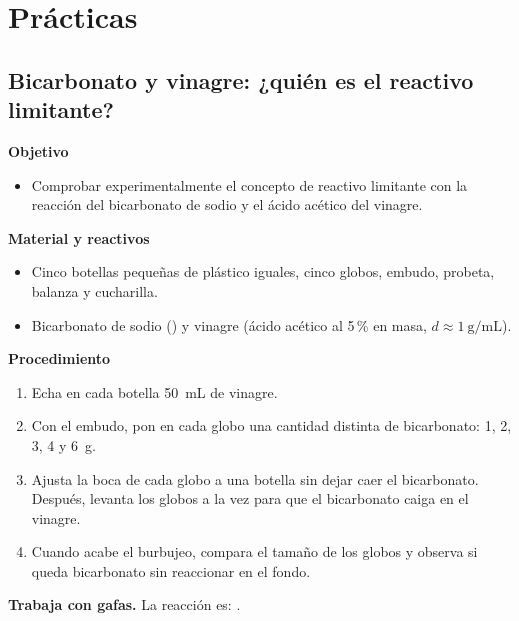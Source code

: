 \section{Prácticas}\label{sec:ud6-practicas}

\subsection{Bicarbonato y vinagre: ¿quién es el reactivo limitante?}

\noindent\begin{minipage}[t]{0.48\textwidth}
    \textbf{Objetivo}
    \begin{itemize}
        \item Comprobar experimentalmente el concepto de reactivo limitante con la reacción del bicarbonato de sodio y el ácido
        acético del vinagre.
    \end{itemize}
\end{minipage}\hfill
\begin{minipage}[t]{0.48\textwidth}
    \textbf{Material y reactivos}
    \begin{itemize}
        \item Cinco botellas pequeñas de plástico iguales, cinco globos, embudo, probeta, balanza y cucharilla.
        \item Bicarbonato de sodio () y vinagre (ácido acético al 5\,\% en masa, \(d \approx \qty{1}{\gram\per\mL}\)).
    \end{itemize}
\end{minipage}

\textbf{Procedimiento}
\begin{enumerate}[label=\numberballgreen]
    \item Echa en cada botella \qty{50}{\mL} de vinagre.
    \item Con el embudo, pon en cada globo una cantidad distinta de bicarbonato: 1, 2, 3, 4 y \qty{6}{\gram}.
    \item Ajusta la boca de cada globo a una botella sin dejar caer el bicarbonato. Después, levanta los globos a la vez para que el
    bicarbonato caiga en el vinagre.
    \item Cuando acabe el burbujeo, compara el tamaño de los globos y observa si queda bicarbonato sin reaccionar en el fondo.
\end{enumerate}
\textbf{Trabaja con gafas.} La reacción es: .

